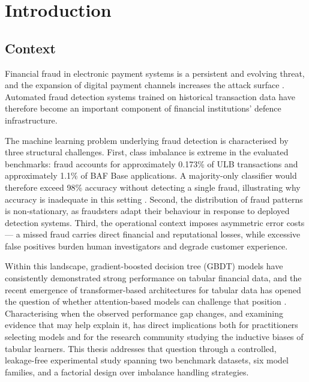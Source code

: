 \chapter{Introduction}
\label{sec:introduction}

\section{Context}
\label{subsec:context}

Financial fraud in electronic payment systems is a persistent and evolving threat, and the expansion of digital payment channels increases the attack surface \cite{rymantubb2018survey}. Automated fraud detection systems trained on historical transaction data have therefore become an important component of financial institutions' defence infrastructure.

The machine learning problem underlying fraud detection is characterised by three structural challenges. First, class imbalance is extreme in the evaluated benchmarks: fraud accounts for approximately 0.173\% of ULB transactions and approximately 1.1\% of BAF Base applications. A majority-only classifier would therefore exceed 98\% accuracy without detecting a single fraud, illustrating why accuracy is inadequate in this setting \cite{hegarcia2009learning}. Second, the distribution of fraud patterns is non-stationary, as fraudsters adapt their behaviour in response to deployed detection systems. Third, the operational context imposes asymmetric error costs — a missed fraud carries direct financial and reputational losses, while excessive false positives burden human investigators and degrade customer experience.

Within this landscape, gradient-boosted decision tree (GBDT) models have consistently demonstrated strong performance on tabular financial data, and the recent emergence of transformer-based architectures for tabular data has opened the question of whether attention-based models can challenge that position \cite{shwartzziv2022tabular}. Characterising when the observed performance gap changes, and examining evidence that may help explain it, has direct implications both for practitioners selecting models and for the research community studying the inductive biases of tabular learners. This thesis addresses that question through a controlled, leakage-free experimental study spanning two benchmark datasets, six model families, and a factorial design over imbalance handling strategies.

